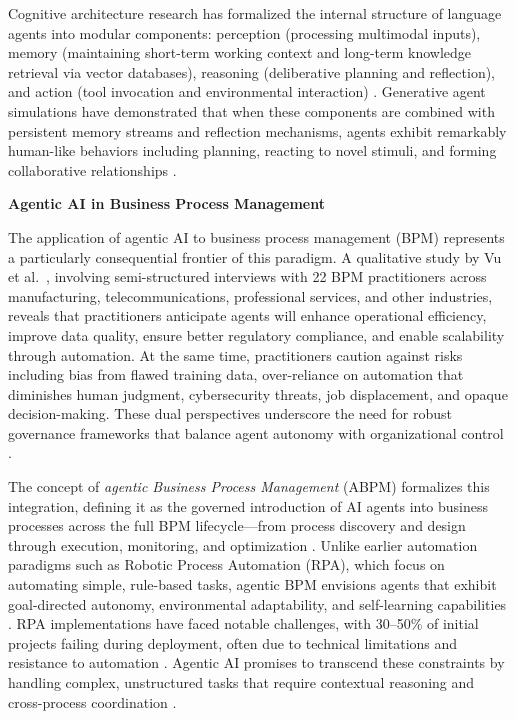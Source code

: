 \documentclass[11pt,a4paper]{article}
\begin{document}
\begin{itemize}
    Cognitive architecture research has formalized the internal structure of language agents into modular components: perception (processing multimodal inputs), memory (maintaining short-term working context and long-term knowledge retrieval via vector databases), reasoning (deliberative planning and reflection), and action (tool invocation and environmental interaction) \cite{sumers2023cognitive}. Generative agent simulations have demonstrated that when these components are combined with persistent memory streams and reflection mechanisms, agents exhibit remarkably human-like behaviors including planning, reacting to novel stimuli, and forming collaborative relationships \cite{park2023generative}.

    \textbf{Agentic AI in Business Process Management}

    The application of agentic AI to business process management (BPM) represents a particularly consequential frontier of this paradigm. A qualitative study by Vu et al.~\cite{vu2025abpm}, involving semi-structured interviews with 22 BPM practitioners across manufacturing, telecommunications, professional services, and other industries, reveals that practitioners anticipate agents will enhance operational efficiency, improve data quality, ensure better regulatory compliance, and enable scalability through automation. At the same time, practitioners caution against risks including bias from flawed training data, over-reliance on automation that diminishes human judgment, cybersecurity threats, job displacement, and opaque decision-making. These dual perspectives underscore the need for robust governance frameworks that balance agent autonomy with organizational control \cite{vu2025abpm, dumas2023abpms}.

    The concept of \textit{agentic Business Process Management} (ABPM) formalizes this integration, defining it as the governed introduction of AI agents into business processes across the full BPM lifecycle—from process discovery and design through execution, monitoring, and optimization \cite{vu2025abpm, kampik2024lpm}. Unlike earlier automation paradigms such as Robotic Process Automation (RPA), which focus on automating simple, rule-based tasks, agentic BPM envisions agents that exhibit goal-directed autonomy, environmental adaptability, and self-learning capabilities \cite{haase2024rpa, flechsig2019rpa}. RPA implementations have faced notable challenges, with 30--50\% of initial projects failing during deployment, often due to technical limitations and resistance to automation \cite{hindle2017rpa}. Agentic AI promises to transcend these constraints by handling complex, unstructured tasks that require contextual reasoning and cross-process coordination \cite{vu2025abpm, estrada2024llmbpm}.


\end{itemize}
\end{document}
